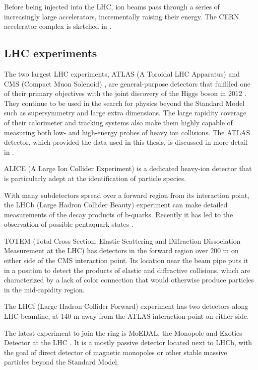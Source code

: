 Before being injected into the LHC, ion beams pass through a series of increasingly large accelerators, incrementally raising their energy.
The CERN accelerator complex is sketched in \Fig{\ref{fig:injection_chain}}.

\subsection{LHC experiments}
The two largest LHC experiments, ATLAS (A Toroidal LHC Apparatus) \cite{Aad:2008zzm} and CMS (Compact Muon Solenoid) \cite{Chatrchyan:2008aa}, are general-purpose detectors that fulfilled one of their primary objectives with the joint discovery of the Higgs boson in 2012 \cite{Aad:2012tfa,Chatrchyan:2012xdj}.
They continue to be used in the search for physics beyond the Standard Model such as supersymmetry and large extra dimensions.
The large rapidity coverage of their calorimeter and tracking systems also make them highly capable of measuring both low- and high-energy probes of heavy ion collisions.
The ATLAS detector, which provided the data used in this thesis, is discussed in more detail in \Sect{\ref{sec:atlas}}.

ALICE (A Large Ion Collider Experiment) \cite{Aamodt:2008zz} is a dedicated heavy-ion detector that is particularly adept at the identification of particle species.

With many subdetectors spread over a forward region from its interaction point, the LHCb (Large Hadron Collider Beauty) experiment \cite{Alves:2008zz} can make detailed measurements of the decay products of b-quarks. Recently it has led to the observation of possible pentaquark states \cite{Aaij:2015tga}.

TOTEM (Total Cross Section, Elastic Scattering and Diffraction Dissociation Measurement at the LHC) \cite{Anelli:2008zza} has detectors in the forward region over 200 m on either side of the CMS interaction point.
Its location near the beam pipe puts it in a position to detect the products of elastic and diffractive collisions, which are characterized by a lack of color connection that would otherwise produce particles in the mid-rapidity region.

The LHCf (Large Hadron Collider Forward) experiment \cite{Adriani:2008zz} has two detectors along LHC beamline, at 140 m away from the ATLAS interaction point on either side.

The latest experiment to join the ring is MoEDAL, the Monopole and Exotics Detector at the LHC \cite{Acharya:2014nyr}.
It is a mostly passive detector located next to LHCb, with the goal of direct detector of magnetic monopoles or other stable massive particles beyond the Standard Model.

